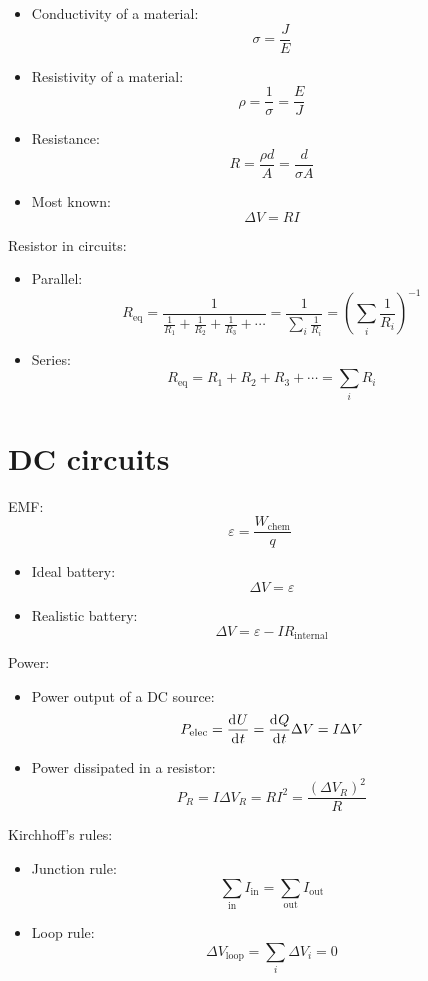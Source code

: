 \documentclass[10pt, twocolumn]{article}
\begin{document}
\begin{itemize}
  \item Conductivity of a material:
        \[
          \sigma = \frac{J}{E}
        \]
  \item Resistivity of a material:
        \[
          \rho = \frac{1}{\sigma} = \frac{E}{J}
        \]
  \item Resistance:
        \[
          R = \frac{\rho d}{A} = \frac{d}{\sigma A}
        \]
  \item Most known:
        \[
          \Delta V = RI
        \]
\end{itemize}

Resistor in circuits:
\begin{itemize}
  \item Parallel:
        \[
          R_{\mathrm{eq}} = \frac{1}{\frac{1}{R_1 } + \frac{1}{R_2 } + \frac{1}{R_3 } + \cdots} = \frac{1}{\sum_i {\frac{1}{R_i }}} = \left( \sum_i {\frac{1}{R_i }} \right)^{-1}
        \]
  \item Series:
        \[
          R_{\mathrm{eq}} = R_1 + R_2 + R_3 + \cdots = \sum_i {R_i }
        \]
\end{itemize}

\section{DC circuits}
EMF:
\[
  \varepsilon = \frac{W_{\mathrm{chem}}}{q}
\]
\begin{itemize}
  \item Ideal battery:
        \[
          \Delta V = \varepsilon
        \]
  \item Realistic battery:
        \[
          \Delta V = \varepsilon - IR_{\mathrm{internal}}
        \]
\end{itemize}

Power:
\begin{itemize}
  \item Power output of a DC source:
        \[
          P_{\mathrm{elec}} = \frac{\mathrm{d}^{} U}{\mathrm{d}^{} t} = \frac{\mathrm{d}^{} Q}{\mathrm{d}^{} t}\Delta V = I\Delta V
        \]
  \item Power dissipated in a resistor:
        \[
          P_R = I\Delta V_R = RI^2 = \frac{\left( \Delta V_R \right)^2 }{R}
        \]
\end{itemize}

Kirchhoff's rules:
\begin{itemize}
  \item Junction rule:
        \[
          \sum_{\mathrm{in}}{I_{\mathrm{in}}} = \sum_{\mathrm{out}}{I_{\mathrm{out}}}
        \]
  \item Loop rule:
        \[
          \Delta V_{\mathrm{loop}} = \sum_i {\Delta V_i } = 0
        \]
\end{itemize}
\end{document}
